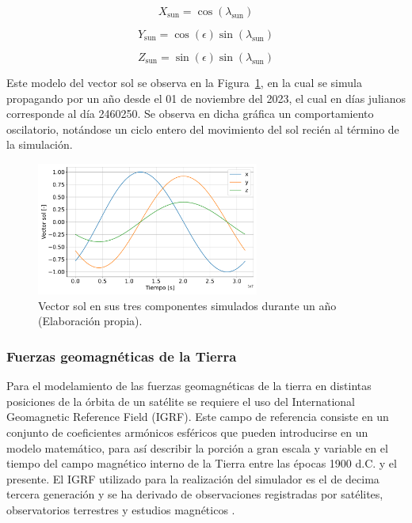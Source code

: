\begin{equation}
	X_{\text{sun}} = \cos(\lambda_{\text{sun}})
	\label{eq:x_sun}
\end{equation}

\begin{equation}
	Y_{\text{sun}} = \cos(\epsilon) \sin(\lambda_{\text{sun}})
	\label{eq:y_sun}
\end{equation}

\begin{equation}
	Z_{\text{sun}} = \sin(\epsilon) \sin(\lambda_{\text{sun}})
	\label{eq:z_sun}
\end{equation}

Este modelo del vector sol se observa en la Figura~\ref{fig:ss}, en la cual se simula propagando por un año desde el 01 de noviembre del 2023, el cual en días julianos corresponde al día 2460250. Se observa en dicha gráfica un comportamiento oscilatorio, notándose un ciclo entero del movimiento del sol recién al término de la simulación.

\begin{figure}[h]
	\centering    
	\includegraphics[width=0.65\textwidth]{ss.pdf}
	\caption{Vector sol en sus tres componentes simulados durante un año (Elaboración propia).}
	\label{fig:ss}
\end{figure}


\subsubsection{Fuerzas geomagnéticas de la Tierra}

Para el modelamiento de las fuerzas geomagnéticas de la tierra en distintas posiciones de la órbita de un satélite se requiere el uso del International Geomagnetic Reference Field (IGRF). Este campo de referencia consiste en un conjunto de coeficientes armónicos esféricos que pueden introducirse en un modelo matemático, para así describir la porción a gran escala y variable en el tiempo del campo magnético interno de la Tierra entre las épocas 1900 d.C. y el presente. El IGRF utilizado para la realización del simulador es el de decima tercera generación y se ha derivado de observaciones registradas por satélites, observatorios terrestres y estudios magnéticos \cite{ref39}.

